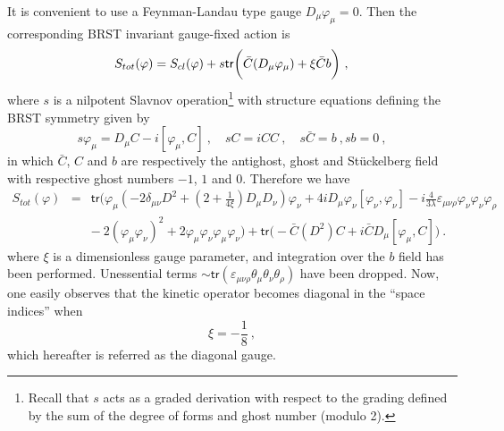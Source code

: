 \documentclass[11pt]{book}
\newcommand{\tr}{\mathsf{tr}}
\theoremstyle{break}
\begin{document}
It is convenient to use a Feynman-Landau type gauge $D_\mu \varphi_\mu=0$. Then the corresponding BRST invariant gauge-fixed action is
%
\begin{equation*}
S_{tot}(\varphi) = S_{cl}(\varphi) + s \tr\bigg(\bar{C} (D_\mu \varphi_\mu) + \xi \bar{C}b \bigg) \ , \nonumber \\ 
\end{equation*}
%
where $s$ is a nilpotent Slavnov operation\footnote{Recall that $s$ acts as a graded derivation with respect to the grading defined by the sum of the degree of forms and ghost number (modulo 2).} with structure equations defining the BRST symmetry given by
%
\begin{equation*}
s\varphi_\mu=D_\mu C - i[\varphi_\mu,C] \ , \quad sC=iCC \ , \quad s\bar{C}=b \ ,  sb=0 \ , 
\end{equation*}
%
in which $\bar{C}$, $C$ and $b$ are respectively the antighost, ghost and St\"uckelberg field with respective ghost numbers $-1$, $1$ and $0$. Therefore we have
%
\begin{eqnarray}
S_{tot}(\varphi) 
&=& \tr\bigg( \varphi_\mu \left( -2\delta_{\mu\nu} D^2 + \left(2+\frac{1}{4\xi} \right) D_\mu D_\nu \right) \varphi_\nu + 4i  D_\mu \varphi_\nu [\varphi_\nu , \varphi_\nu] - i\frac{4}{3\lambda} \varepsilon_{\mu\nu\rho} \varphi_\nu \varphi_\nu \varphi_\rho \nonumber\\
&& - \ 2 (\varphi_\mu \varphi_\nu)^2 + 2 \varphi_\mu \varphi_\nu \varphi_\mu \varphi_\nu \bigg) + \tr\bigg(-\bar{C}(D^2)C+i\bar{C}D_\mu[\varphi_\mu,C] \bigg) \ . 
\label{eq:gauge_fix_final}
\end{eqnarray}
%
where $\xi$ is a dimensionless gauge parameter, and integration over the $b$ field has been performed. Unessential terms $\sim \tr(\varepsilon_{\mu\nu\rho} \theta_\mu \theta_\nu \theta_\rho)$ have been dropped. Now, one easily observes that the kinetic operator becomes diagonal in the ``space indices'' when
%
\begin{equation*}
\xi=-\frac{1}{8} \ ,
\end{equation*}
%
which hereafter is referred as the diagonal gauge. 


\bigskip
\end{document}
